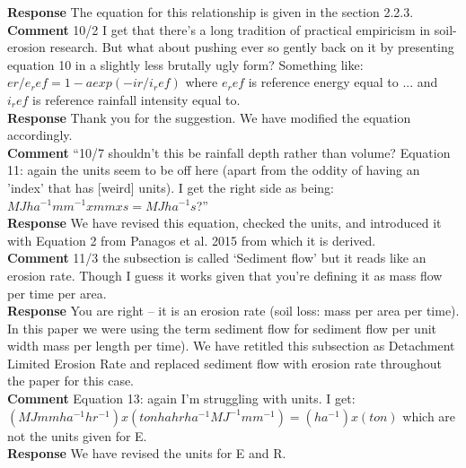 \documentclass[gmd, manuscript]{copernicus}
\begin{document}
\noindent\textbf{Response}
The equation for this relationship is given in the section 2.2.3.
\\


\noindent\textbf{Comment}
10/2 I get that there’s a long tradition of practical empiricism in soil-erosion research. But what about pushing ever so gently back on it by presenting equation 10 in a slightly less brutally ugly form? Something like: $er / e_ref = 1 - a exp( -ir / i_ref )$ where $e_ref$ is reference energy equal to ... and $i_ref$ is reference rainfall intensity equal to.
\\

\noindent\textbf{Response}
Thank you for the suggestion. We have modified the equation accordingly.
\\

\noindent\textbf{Comment}
“10/7 shouldn’t this be rainfall depth rather than volume? Equation 11: again the units seem to be off here (apart from the oddity of having an ’index’ that has [weird] units). I get the right side as being: $MJ ha^{-1} mm^{-1} x mm x s = MJ ha^{-1} s$?”
\\

\noindent\textbf{Response}
We have revised this equation, checked the units, and introduced it with  Equation 2 from Panagos et al. 2015 from which it is derived. 
\\

\noindent\textbf{Comment}
11/3 the subsection is called `Sediment flow' but it reads like an erosion rate. Though I guess it works given that you're defining it as mass flow per time per area.
\\

\noindent\textbf{Response}
You are right -- it is an erosion rate (soil loss: mass per area per time). In this paper we were using the term sediment flow for sediment flow per unit width mass per length per time). We have retitled this subsection as Detachment Limited Erosion Rate and replaced sediment flow with erosion rate throughout the paper for this case. 
\\

\noindent\textbf{Comment}
Equation 13: again I'm struggling with units. I get: $(MJ mm ha^{-1} hr^{-1}) x (ton ha hr ha^{-1} MJ^{-1} mm^{-1}) = (ha^{-1}) x (ton)$ which are not the units given for E.
\\

\noindent\textbf{Response}
We have revised the units for E and R. 
\\
\end{document}

